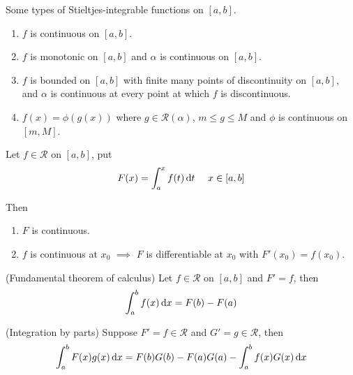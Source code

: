     \begin{theo}
        Some types of Stieltjes-integrable functions on $[a,b]$.
        \begin{enumerate}
            \item $f$ is continuous on $[a,b]$.
            \item $f$ is monotonic on $[a,b]$ and $\alpha$ is continuous on $[a,b]$.
            \item $f$ is bounded on $[a,b]$ with finite many points of discontinuity on $[a,b]$, and $\alpha$ is continuous at every point at which $f$ is discontinuous.
            \item $f(x) = \phi(g(x))$ where $g \in \mathscr{R}(\alpha)$, $m \leq g \leq M$ and $\phi$ is continuous on $[m,M]$.
        \end{enumerate}
    \end{theo}

    \begin{theo}
        Let $f \in \mathscr{R}$ on $[a,b]$, put
        \begin{equation}
            F(x) = \int_a^x f(t) \mathop{}\!\mathrm{d} t \ \ \ \ x \in [a,b]
        \end{equation}

        Then 
        \begin{enumerate}
            \item $F$ is continuous.
            \item $f$ is continuous at $x_0$ $\implies$ $F$ is differentiable at $x_0$ with $F'(x_0)=f(x_0)$.
        \end{enumerate}
        
    \end{theo}

    \begin{theo} (Fundamental theorem of calculus)
        Let $f \in \mathscr{R}$ on $[a,b]$ and $F' = f$, then
        \begin{equation}
            \int_a^b f(x) \mathop{}\!\mathrm{d} x = F(b)-F(a)
        \end{equation}
    \end{theo}

    \begin{theo} (Integration by parts)
        Suppose $F'=f\in \mathscr{R}$ and $G'=g\in \mathscr{R}$, then
        \begin{equation}
            \int_a^b F(x)g(x) \mathop{}\!\mathrm{d} x = F(b)G(b)-F(a)G(a)-\int_a^b f(x)G(x) \mathop{}\!\mathrm{d} x
        \end{equation}
    \end{theo}
